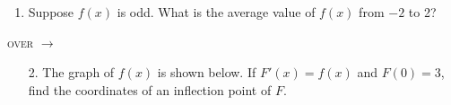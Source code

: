 \documentclass[11pt]{article}
\begin{document}
\pagestyle{empty}
\newsavebox{\quizfront}
\begin{lrbox}{\quizfront}
\begin{minipage}[top][4.5in][t]{\textwidth} \setlength{\parindent}{1.5em}
\drawtitle
\vspace{-0.5in}
\begin{enumerate}

\item Suppose $f(x)$ is odd. What is the average value of $f(x)$ from
  $-2$ to 2?

\end{enumerate}

\vfill

\hfill\textsc{over} $\longrightarrow$


\end{minipage}
\end{lrbox}

\newsavebox{\quizback}
\begin{lrbox}{\quizback}
\begin{minipage}[top][4.5in][t]{\textwidth} \setlength{\parindent}{1.5em}
\begin{enumerate}

\item[2.] The graph of $f(x)$ is shown below. If $F'(x)=f(x)$ and
  $F(0) = 3$, find the coordinates of an inflection point of $F$.

  \begin{center}
  \end{center}
  
\end{enumerate}
\end{minipage}
\end{lrbox}

\noindent \usebox{\quizfront}
\vfill
\noindent \usebox{\quizfront}

\pagebreak
\noindent \usebox{\quizback}
\vfill
\noindent \usebox{\quizback}
\end{document}
